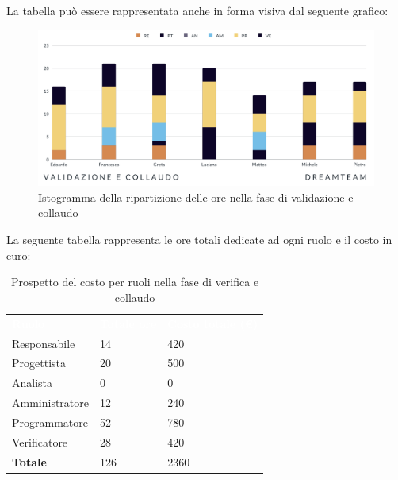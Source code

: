 La tabella può essere rappresentata anche in forma visiva dal seguente grafico:
\begin{figure}[!h]
\centering
\includegraphics[scale=0.65]{Sezioni/SezioniPreventivo/grafici/Validazione_collaudo.png}
\caption{Istogramma della ripartizione delle ore  nella fase di validazione e collaudo}
\end{figure}

La seguente tabella rappresenta le ore totali dedicate ad ogni ruolo e il costo in euro:

\begin{table}[!htbp]
\begin{center}
\renewcommand{\arraystretch}{1.5}
\begin{tabular}{ m{}<{\centering}  m{}<{\centering} m{}<{\centering}}
	\rowcolor{darkblue}
	\textcolor{white}{\textbf{Ruolo}}&\textcolor{white}{\textbf{Totale ore}}&\textcolor{white}{\textbf{Costo totale (\euro)}}\\ 

	Responsabile  & 14 & 420 \\	
	
	Progettista & 20 & 500 \\
	
	Analista & 0 & 0 \\

	Amministratore & 12 & 240 \\
	
	Programmatore & 52 & 780 \\
	
	Verificatore & 28 & 420 \\
	
	\textbf{Totale} & 126 & 2360 \\
	
\end{tabular}
\caption{Prospetto del costo per ruoli nella fase di verifica e collaudo}
\end{center}
\end{table}

